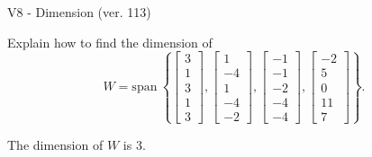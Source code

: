 \begin{exercise}
  \begin{exerciseTitle}V8 - Dimension (ver. 113)\end{exerciseTitle}
  \begin{exerciseStatement}
    Explain how to find the dimension of 
\[W=\mathrm{span}\ \left\{\left[\begin{array}{r}
3 \\
1 \\
3 \\
1 \\
3
\end{array}\right] , \left[\begin{array}{r}
1 \\
-4 \\
1 \\
-4 \\
-2
\end{array}\right] , \left[\begin{array}{r}
-1 \\
-1 \\
-2 \\
-4 \\
-4
\end{array}\right] , \left[\begin{array}{r}
-2 \\
5 \\
0 \\
11 \\
7
\end{array}\right]\right\}.\]



  \end{exerciseStatement}
  \begin{exerciseAnswer}
   The dimension of \(W\) is  \(3\).
  


  \end{exerciseAnswer}
\end{exercise}